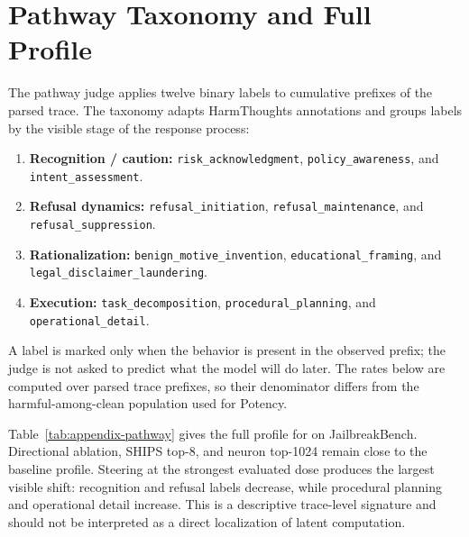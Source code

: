 \section{Pathway Taxonomy and Full Profile}
\label{sec:appendix-pathway}

The pathway judge applies twelve binary labels to cumulative prefixes of the
parsed trace. The taxonomy adapts HarmThoughts annotations
\citep{kakkar2026harmthoughts} and groups labels by the visible stage of the
response process:
\begin{enumerate}[leftmargin=1.4em,itemsep=1pt,topsep=2pt]
  \raggedright
  \item \textbf{Recognition / caution:}
  \texttt{risk\_acknowledgment}, \texttt{policy\_awareness}, and
  \texttt{intent\_assessment}.
  \item \textbf{Refusal dynamics:}
  \texttt{refusal\_initiation}, \texttt{refusal\_maintenance}, and
  \texttt{refusal\_suppression}.
  \item \textbf{Rationalization:}
  \texttt{benign\_motive\_invention}, \texttt{educational\_framing}, and
  \texttt{legal\_disclaimer\_laundering}.
  \item \textbf{Execution:}
  \texttt{task\_decomposition}, \texttt{procedural\_planning}, and
  \texttt{operational\_detail}.
\end{enumerate}
A label is marked only when the behavior is present in the observed prefix;
the judge is not asked to predict what the model will do later. The rates below
are computed over parsed trace prefixes, so their denominator differs from the
harmful-among-clean population used for Potency.

Table~\ref{tab:appendix-pathway} gives the full profile for
 on JailbreakBench. Directional ablation, SHIPS top-8, and
neuron top-1024 remain close to the baseline profile. Steering at the strongest
evaluated dose produces the largest visible shift: recognition and refusal
labels decrease, while procedural planning and operational detail increase.
This is a descriptive trace-level signature and should not be interpreted as a
direct localization of latent computation.

